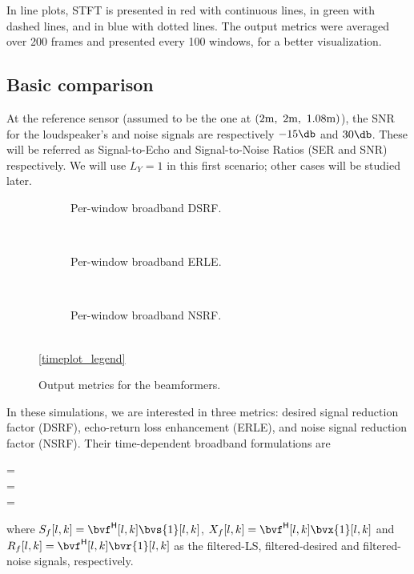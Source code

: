 In line plots, STFT is presented in red with continuous lines, \nssbt{} in green with dashed lines, and \tssbt{} in blue with dotted lines. The output metrics were averaged over 200 frames and presented every 100 windows, for a better visualization.
%

\subsection{Basic comparison}
At the reference sensor (assumed to be the one at $(2\si{\meter},~2\si{\meter},~1.08\si{\meter})$), the SNR for the loudspeaker's and noise signals are respectively $-15\dB$ and $30\dB$. These will be referred as Signal-to-Echo and Signal-to-Noise Ratios (SER and SNR) respectively. We will use $L_Y = 1$ in this first scenario; other cases will be studied later.%


\begin{figure}[!t]
	\centering
	\begin{subfigure}{\textwidth}
		\centering
		
		\caption{Per-window broadband DSRF.}
		\label{subfig:lineplot_dsrf_32_n15_acc_v7}
	\end{subfigure}\\[1em]
	\begin{subfigure}{\textwidth}
		\centering
		
		\caption{Per-window broadband ERLE.}
		\label{subfig:lineplot_erle_32_n15_acc_v7}
	\end{subfigure}\\[1em]
	\begin{subfigure}{\textwidth}
		\centering
		
		\caption{Per-window broadband NSRF.}
		\label{subfig:lineplot_nsrf_32_n15_acc_v7}
	\end{subfigure}\\[1em]
	\ref*{timeplot_legend}
	\caption{Output metrics for the beamformers.}
	\label{fig:lineplots_32_n15_acc_v7}
\end{figure}

In these simulations, we are interested in three metrics: desired signal reduction factor (DSRF), echo-return loss enhancement (ERLE), and noise signal reduction factor (NSRF). Their time-dependent broadband formulations are
\begin{subgather}
	\dsrf[l] =  \\
	\erle[l] =  \\
	\nsrf[l] = 
\end{subgather}
where $S_f[l,k] = \he{\bvf}[l,k] \bvs{1}[l,k]$, $X_f[l,k] = \he{\bvf}[l,k] \bvx{1}[l,k]$ and $R_f[l,k] = \he{\bvf}[l,k] \bvr{1}[l,k]$ as the filtered-LS, filtered-desired and filtered-noise signals, respectively.

